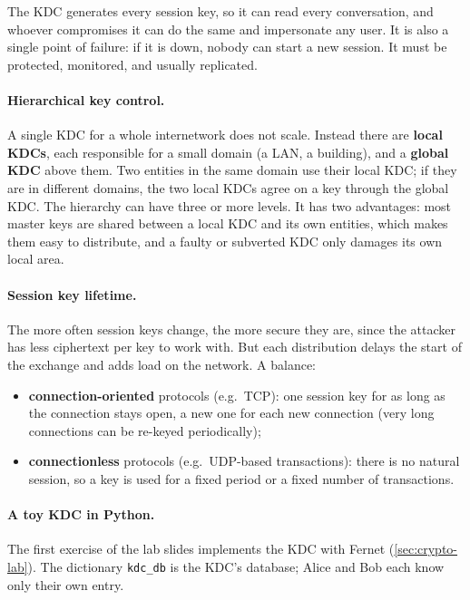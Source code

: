 \begin{remark}
The KDC generates every session key, so it can read every conversation, and whoever compromises it can do the same and impersonate any user. It is also a single point of failure: if it is down, nobody can start a new session. It must be protected, monitored, and usually replicated.
\end{remark}

\paragraph{Hierarchical key control.} A single KDC for a whole internetwork does not scale. Instead there are \textbf{local KDCs}, each responsible for a small domain (a LAN, a building), and a \textbf{global KDC} above them. Two entities in the same domain use their local KDC; if they are in different domains, the two local KDCs agree on a key through the global KDC. The hierarchy can have three or more levels. It has two advantages: most master keys are shared between a local KDC and its own entities, which makes them easy to distribute, and a faulty or subverted KDC only damages its own local area.

\paragraph{Session key lifetime.} The more often session keys change, the more secure they are, since the attacker has less ciphertext per key to work with. But each distribution delays the start of the exchange and adds load on the network. A balance:
\begin{itemize}
    \item \textbf{connection-oriented} protocols (e.g.\ TCP): one session key for as long as the connection stays open, a new one for each new connection (very long connections can be re-keyed periodically);
    \item \textbf{connectionless} protocols (e.g.\ UDP-based transactions): there is no natural session, so a key is used for a fixed period or a fixed number of transactions.
\end{itemize}

\paragraph{A toy KDC in Python.} The first exercise of the lab slides implements the KDC with Fernet (\cref{sec:crypto-lab}). The dictionary \texttt{kdc\_db} is the KDC's database; Alice and Bob each know only their own entry.

